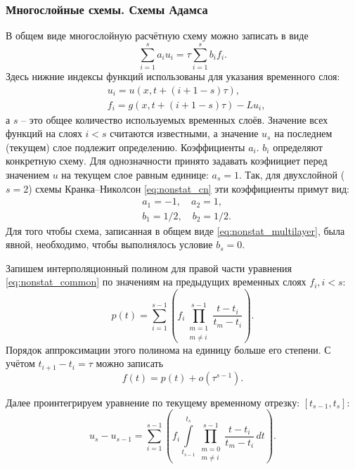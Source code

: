 \subsubsection{Многослойные схемы. Схемы Адамса}
В общем виде многослойную расчётную схему можно записать в виде
\begin{equation}
\label{eq:nonstat_multilayer}
\sum\limits_{i=1}^{s} a_i u_i = \tau \sum\limits_{i=1}^{s} b_i f_i.
\end{equation}
Здесь нижние индексы функций использованы для указания временного слоя:
\begin{equation*}
\begin{aligned}
&u_i = u(x, t + (i+1-s)\tau),\\
&f_i = g(x, t + (i+1-s)\tau) - Lu_i,
\end{aligned}
\end{equation*}
а $s$ -- это общее количество используемых временных слоёв.
Значение всех функций на слоях $i<s$ считаются известными, а значение $u_s$ на последнем (текущем) слое подлежит определению.
Коэффициенты $a_i$. $b_i$ определяют конкретную схему.
Для однозначности принято задавать коэфиициет перед значением $u$ на текущем слое равным единице: $a_s = 1$.
Так, для двухслойной ($s=2$) схемы Кранка--Николсон \cref{eq:nonstat_cn} эти коэффициенты примут вид:
\begin{align*}
&a_1 = -1, \quad a_2 = 1,\\
&b_1 = 1/2, \quad b_2 = 1/2.
\end{align*}
Для того чтобы схема, записанная в общем виде \cref{eq:nonstat_multilayer}, была явной,
необходимо, чтобы выполнялось условие $b_s = 0$.

Запишем интерполяционный полином для правой части уравнения \cref{eq:nonstat_common}
по значениям на предыдущих временных слоях $f_i, i<s$:
\begin{equation*}
p(t) = \sum\limits_{i=1}^{s-1}\left(f_i \prod\limits_{\substack{m=1\\m \neq i}}^{s-1} \frac{t - t_i}{t_m - t_i} \right).
\end{equation*}
Порядок аппроксимации этого полинома на единицу больше его степени. С учётом 
$t_{i+1} - t_{i} = \tau$ можно записать
\begin{equation*}
f(t) = p(t) + o(\tau^{s-1}).
\end{equation*}

Далее проинтегрируем уравнение по текущему временному отрезку: $[t_{s-1}, t_{s}]$:
\begin{equation*}
u_s - u_{s-1} = \sum_{i=1}^{s-1}\left( f_i \int\limits_{t_{s-1}}^{t_s} \prod \limits_{\substack{m=0\\m\neq i}}^{s-1} \frac{t - t_i}{t_m - t_i}\, dt \right).
\end{equation*}

